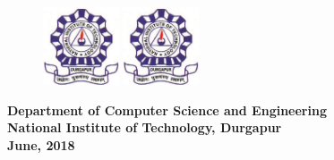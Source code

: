 \begin{titlepage}
\begin{center}
\vskip 0.15in
\begin{figure}[h]
\centering
\ifpdf
\includegraphics[width=0.2\textwidth]{NIT_Logo.eps} %
\else
\includegraphics[width=0.2\textwidth]{NIT_Logo.eps} %
\fi
\end{figure}

\begin{large}
\textbf{Department of Computer Science and Engineering}\\
\textbf{National Institute of Technology, Durgapur}\\
\vskip 0.1in
\textbf{June, 2018}
\end{large}


\end{center}
\end{titlepage}


\mbox{}
\thispagestyle{empty}
\newpage

